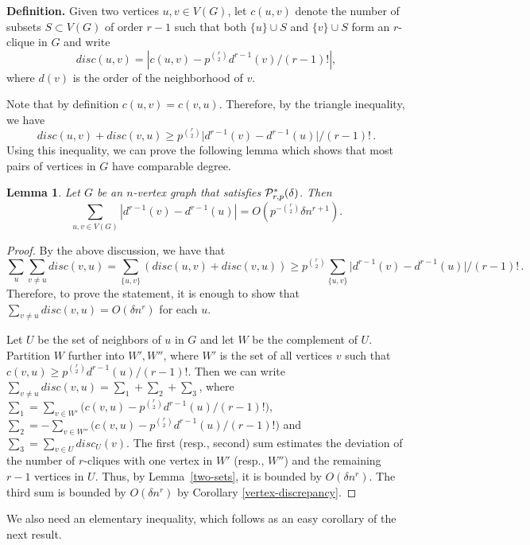 \documentclass[11pt]{article}
\newtheorem{lemma}{Lemma}[section]
\begin{document}
\vspace{3mm}

\noindent
{\bf Definition.} Given two vertices $u, v \in V(G)$, let $c(u,v)$ denote the number of subsets $S \subset V(G)$ of order $r-1$ such that
both $\{u\} \cup S$ and $\{v\} \cup S$ form an $r$-clique in $G$ and write 
$$disc(u,v)=\left|c(u,v) - p^{{r \choose 2}} d^{r-1}(v)/(r-1)!\right|,$$
where $d(v)$ is the order of the neighborhood of $v$.

\vspace{3mm}

\noindent
Note that by definition $c(u,v)=c(v,u)$. Therefore, by the triangle inequality, we have
$$disc(u,v)+disc(v,u) \geq  p^{{r \choose 2}} \big|d^{r-1}(v)-d^{r-1}(u)\big|/(r-1)!\,.$$
Using this inequality, we can prove the following lemma which shows that most pairs of vertices in $G$ have comparable degree.

\begin{lemma}\label{degrees}
Let $G$ be an $n$-vertex graph that satisfies
${\cal P}^*_{r,p}(\delta)$. Then 
$$\sum_{u,v \in V(G)} |d^{r-1}(v)-d^{r-1}(u)| = O(p^{-{r \choose 2}}\delta n^{r+1}). $$
\end{lemma}

\begin{proof}
By the above discussion, we have that
$$ \sum_u \sum_{v \neq u} disc(v,u)=\sum_{\{u,v\}}(disc(u,v)+disc(v,u)) \geq  p^{{r \choose 2}} \sum_{\{u,v\}}\big|d^{r-1}(v)-d^{r-1}(u)\big|/(r-1)!\,.$$
Therefore, to prove the statement, it is enough to show that $\sum_{v \neq u} disc(v,u)= O(\delta n^r)$ for each $u$.

Let $U$ be the set of neighbors of $u$ in $G$ and let $W$ be the complement of $U$. Partition $W$ further into $W', W''$, where $W'$ is the set of all vertices $v$ such that  $c(v,u) \geq p^{{r \choose 2}} d^{r-1}(u)/(r-1)!$. Then we can write 
$\sum_{v \neq u} disc(v, u)= \sum_1+\sum_2+\sum_3$, where $\sum_1=\sum_{v \in W'} \big(c(v,u) - p^{{r \choose 2}} d^{r-1}(u)/(r-1)!\big)$,
$\sum_2= -\sum_{v \in W''} \big(c(v,u) - p^{{r \choose 2}} d^{r-1}(u)/(r-1)!\big)$ and 
$\sum_3=\sum_{v \in U} disc_{U}(v)$.  The first (resp., second) sum estimates the deviation of the number of $r$-cliques with one vertex in $W'$ (resp., $W''$) and the remaining $r-1$ vertices in $U$. Thus, by Lemma~\ref{two-sets}, it is bounded by $O(\delta n^r)$.
The third sum is bounded by $O(\delta n^r)$ by Corollary \ref{vertex-discrepancy}. 
\end{proof}

We also need an elementary inequality, which follows as an easy corollary of the next result.
\end{document}
